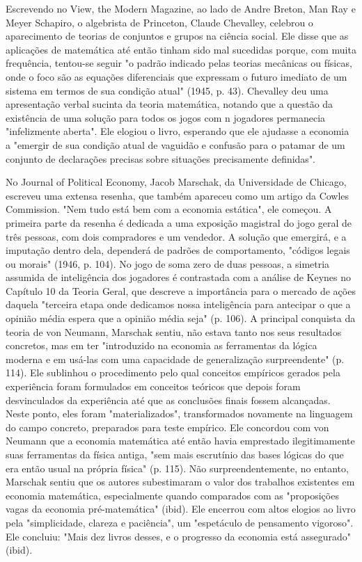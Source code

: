 \documentclass[12pt]{article}
\begin{document}
Escrevendo no View, the Modern Magazine, ao lado de Andre Breton, Man Ray e Meyer Schapiro, o algebrista de Princeton, Claude Chevalley, celebrou o aparecimento de teorias de conjuntos e grupos na ciência social. Ele disse que as aplicações de matemática até então tinham sido mal sucedidas porque, com muita frequência, tentou-se seguir "o padrão indicado pelas teorias mecânicas ou físicas, onde o foco são as equações diferenciais que expressam o futuro imediato de um sistema em termos de sua condição atual" (1945, p. 43). Chevalley deu uma apresentação verbal sucinta da teoria matemática, notando que a questão da existência de uma solução para todos os jogos com n jogadores permanecia "infelizmente aberta". Ele elogiou o livro, esperando que ele ajudasse a economia a "emergir de sua condição atual de vaguidão e confusão para o patamar de um conjunto de declarações precisas sobre situações precisamente definidas".

No Journal of Political Economy, Jacob Marschak, da Universidade de Chicago, escreveu uma extensa resenha, que também apareceu como um artigo da Cowles Commission. "Nem tudo está bem com a economia estática", ele começou. A primeira parte da resenha é dedicada a uma exposição magistral do jogo geral de três pessoas, com dois compradores e um vendedor. A solução que emergirá, e a imputação dentro dela, dependerá de padrões de comportamento, "códigos legais ou morais" (1946, p. 104). No jogo de soma zero de duas pessoas, a simetria assumida de inteligência dos jogadores é contrastada com a análise de Keynes no Capítulo 10 da Teoria Geral, que descreve a importância para o mercado de ações daquela "terceira etapa onde dedicamos nossa inteligência para antecipar o que a opinião média espera que a opinião média seja" (p. 106). A principal conquista da teoria de von Neumann, Marschak sentiu, não estava tanto nos seus resultados concretos, mas em ter "introduzido na economia as ferramentas da lógica moderna e em usá-las com uma capacidade de generalização surpreendente" (p. 114). Ele sublinhou o procedimento pelo qual conceitos empíricos gerados pela experiência foram formulados em conceitos teóricos que depois foram desvinculados da experiência até que as conclusões finais fossem alcançadas. Neste ponto, eles foram "materializados", transformados novamente na linguagem do campo concreto, preparados para teste empírico. Ele concordou com von Neumann que a economia matemática até então havia emprestado ilegitimamente suas ferramentas da física antiga, "sem mais escrutínio das bases lógicas do que era então usual na própria física" (p. 115). Não surpreendentemente, no entanto, Marschak sentiu que os autores subestimaram o valor dos trabalhos existentes em economia matemática, especialmente quando comparados com as "proposições vagas da economia pré-matemática" (ibid). Ele encerrou com altos elogios ao livro pela "simplicidade, clareza e paciência", um "espetáculo de pensamento vigoroso". Ele concluiu: "Mais dez livros desses, e o progresso da economia está assegurado" (ibid).
\end{document}
